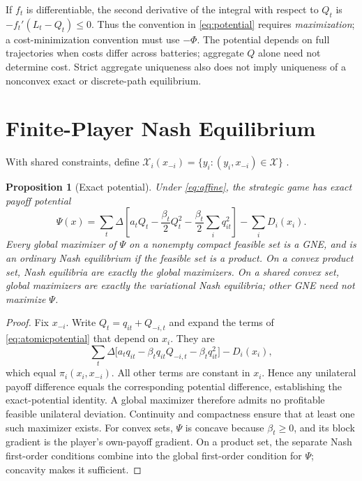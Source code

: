 \documentclass[11pt]{article}
\newtheorem{proposition}[assumption]{Proposition}
\theoremstyle{remark}
\newcommand{\X}{\mathcal X}
\begin{document}
If $f_t$ is differentiable, the second derivative of the integral with
respect to $Q_t$ is $-f_t'(L_t-Q_t)\le0$. Thus the convention in
\eqref{eq:potential} requires \emph{maximization}; a cost-minimization
convention must use $-\Phi$. The potential depends on full trajectories when
costs differ across batteries; aggregate $Q$ alone need not determine cost.
Strict aggregate uniqueness also does not imply uniqueness of a nonconvex
exact or discrete-path equilibrium.

\section{Finite-Player Nash Equilibrium}
\label{sec:nash}

With shared constraints, define
$\X_i(x_{-i})=\{y_i:(y_i,x_{-i})\in\X\}$ .

\begin{proposition}[Exact potential]
\label{prop:atomic}
Under \eqref{eq:affine}, the strategic game has exact payoff potential
\begin{equation}
 \Psi(x)=\sum_t\Delta\left[
       a_tQ_t-\frac{\beta_t}{2}Q_t^2
              -\frac{\beta_t}{2}\sum_iq_{it}^2\right]
              -\sum_iD_i(x_i).
 \label{eq:atomicpotential}
\end{equation}
Every global maximizer of $\Psi$ on a nonempty compact feasible set is a
GNE, and is an ordinary Nash equilibrium if the feasible set is a product.
On a convex product set, Nash equilibria are exactly the global maximizers.
On a shared convex set, global maximizers are exactly the
\emph{variational} Nash equilibria; other GNE need not maximize $\Psi$.
\end{proposition}

\begin{proof}
Fix $x_{-i}$. Write $Q_t=q_{it}+Q_{-i,t}$ and expand the terms of
\eqref{eq:atomicpotential} that depend on $x_i$. They are
\[
 \sum_t\Delta\big[a_tq_{it}-\beta_tq_{it}Q_{-i,t}
                         -\beta_tq_{it}^2\big]-D_i(x_i),
\]
which equal $\pi_i(x_i,x_{-i})$. All other terms are constant in $x_i$.
Hence any unilateral payoff difference equals the corresponding potential
difference, establishing the exact-potential identity. A global maximizer
therefore admits no profitable feasible unilateral deviation. Continuity and
compactness ensure that at least one such maximizer exists.
For convex sets, $\Psi$ is concave because $\beta_t\ge0$, and its block
gradient is the player's own-payoff gradient. On a product set, the separate
Nash first-order conditions combine into the global first-order condition
for $\Psi$; concavity makes it sufficient.
\end{proof}
\end{document}
